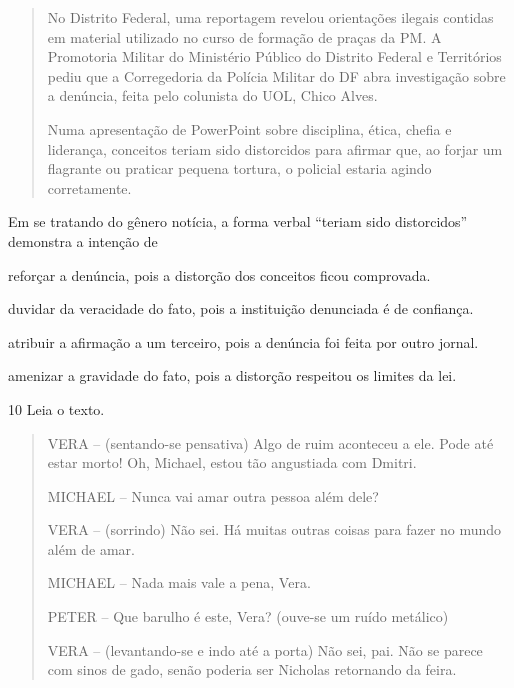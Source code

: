 \begin{quote}
No Distrito Federal, uma reportagem revelou orientações ilegais contidas
em material utilizado no curso de formação de praças da PM. A Promotoria
Militar do Ministério Público do Distrito Federal e Territórios pediu
que a Corregedoria da Polícia Militar do DF abra investigação sobre a
denúncia, feita pelo colunista do UOL, Chico Alves.

Numa apresentação de PowerPoint sobre disciplina, ética, chefia e
liderança, conceitos teriam sido distorcidos para afirmar que, ao forjar
um flagrante ou praticar pequena tortura, o policial estaria agindo
corretamente.

\end{quote}

Em se tratando do gênero notícia, a forma verbal ``teriam sido
distorcidos'' demonstra a intenção de

\begin{escolha}
\item reforçar a denúncia, pois a distorção dos conceitos ficou comprovada.

\item duvidar da veracidade do fato, pois a instituição denunciada é de confiança.

\item atribuir a afirmação a um terceiro, pois a denúncia foi feita por outro jornal.

\item amenizar a gravidade do fato, pois a distorção respeitou os limites da lei.
\end{escolha}

\num{10} Leia o texto.

\begin{quote}
VERA -- (sentando-se pensativa) Algo de ruim aconteceu a ele. Pode até
estar morto! Oh, Michael, estou tão angustiada com Dmitri.

MICHAEL -- Nunca vai amar outra pessoa além dele?

VERA -- (sorrindo) Não sei. Há muitas outras coisas para fazer no mundo
além de amar.

MICHAEL -- Nada mais vale a pena, Vera.

PETER -- Que barulho é este, Vera? (ouve-se um ruído metálico)

VERA -- (levantando-se e indo até a porta) Não sei, pai. Não se parece
com sinos de gado, senão poderia ser Nicholas retornando da feira.

\end{quote}

